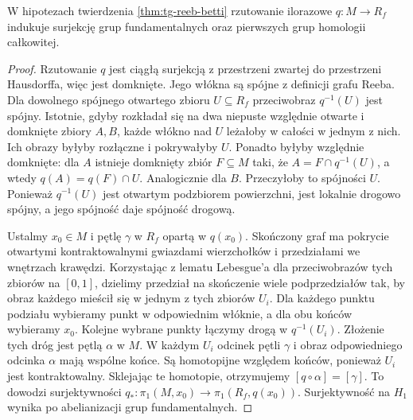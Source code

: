 \begin{stwierdzenie}
\label{prop:tg-reeb-pi1-surj}
W hipotezach twierdzenia \ref{thm:tg-reeb-betti}
rzutowanie ilorazowe $q:M\to R_f$ indukuje
surjekcję grup fundamentalnych oraz pierwszych
grup homologii całkowitej.
\end{stwierdzenie}
\begin{proof}
Rzutowanie $q$ jest ciągłą surjekcją z przestrzeni
zwartej do przestrzeni Hausdorffa, więc jest
domknięte. Jego włókna są spójne z definicji
grafu Reeba. Dla dowolnego spójnego otwartego
zbioru $U\subseteq R_f$ przeciwobraz $q^{-1}(U)$
jest spójny. Istotnie, gdyby rozkładał się na
dwa niepuste względnie otwarte i domknięte
zbiory $A,B$, każde włókno nad $U$ leżałoby
w całości w jednym z nich. Ich obrazy byłyby
rozłączne i pokrywałyby $U$. Ponadto byłyby
względnie domknięte: dla $A$ istnieje domknięty
zbiór $F\subseteq M$ taki, że
$A=F\cap q^{-1}(U)$, a wtedy
$q(A)=q(F)\cap U$. Analogicznie dla $B$.
Przeczyłoby to spójności $U$.
Ponieważ $q^{-1}(U)$ jest otwartym podzbiorem
powierzchni, jest lokalnie drogowo spójny,
a jego spójność daje spójność drogową.

Ustalmy $x_0\in M$ i pętlę $\gamma$ w $R_f$
opartą w $q(x_0)$. Skończony graf ma pokrycie
otwartymi kontraktowalnymi gwiazdami wierzchołków
i przedziałami we wnętrzach krawędzi. Korzystając
z lematu Lebesgue'a dla przeciwobrazów tych zbiorów
na $[0,1]$, dzielimy przedział na skończenie wiele
podprzedziałów tak, by obraz każdego mieścił
się w jednym z tych zbiorów $U_i$.
Dla każdego punktu podziału wybieramy punkt
w odpowiednim włóknie, a dla obu końców
wybieramy $x_0$. Kolejne wybrane punkty
łączymy drogą w $q^{-1}(U_i)$.
Złożenie tych dróg jest pętlą $\alpha$ w $M$.
W każdym $U_i$ odcinek pętli $\gamma$ i obraz
odpowiedniego odcinka $\alpha$ mają wspólne końce.
Są homotopijne względem końców, ponieważ $U_i$
jest kontraktowalny. Sklejając te homotopie,
otrzymujemy $[q\circ\alpha]=[\gamma]$.
To dowodzi surjektywności $q_*:\pi_1(M,x_0)
\to\pi_1(R_f,q(x_0))$. Surjektywność na $H_1$
wynika po abelianizacji grup fundamentalnych.
\end{proof}

